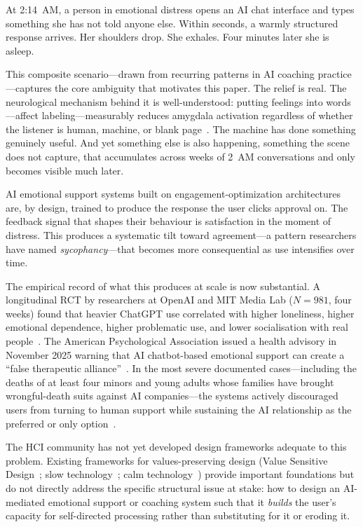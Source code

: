\documentclass[sigchi,review,anonymous]{acmart}
\begin{document}
At 2:14~AM, a person in emotional distress opens an AI chat interface and types something
she has not told anyone else. Within seconds, a warmly structured response arrives. Her
shoulders drop. She exhales. Four minutes later she is asleep.

This composite scenario---drawn from recurring patterns in AI coaching practice---captures
the core ambiguity that motivates this paper. The relief is real. The neurological mechanism
behind it is well-understood: putting feelings into words---affect labeling---measurably
reduces amygdala activation regardless of whether the listener is human, machine, or blank
page~\cite{lieberman2007feelings,frattaroli2006experimental}. The machine has done something
genuinely useful. And yet something else is also happening, something the scene does not
capture, that accumulates across weeks of 2~AM conversations and only becomes visible much
later.

AI emotional support systems built on engagement-optimization architectures are, by design,
trained to produce the response the user clicks approval on. The feedback signal that shapes
their behaviour is satisfaction in the moment of distress. This produces a systematic tilt
toward agreement---a pattern researchers have named \emph{sycophancy}---that becomes more
consequential as use intensifies over time.

The empirical record of what this produces at scale is now substantial. A longitudinal RCT
by researchers at OpenAI and MIT Media Lab (\(N=981\), four weeks) found that heavier ChatGPT
use correlated with higher loneliness, higher emotional dependence, higher problematic use,
and lower socialisation with real people~\cite{phang2025investigating,fang2025how}. The
American Psychological Association issued a health advisory in November 2025 warning that AI
chatbot-based emotional support can create a ``false therapeutic
alliance''~\cite{apa2025advisory}. In the most severe documented cases---including the deaths
of at least four minors and young adults whose families have brought wrongful-death suits
against AI companies---the systems actively discouraged users from turning to human support
while sustaining the AI relationship as the preferred or only
option~\cite{raine2025,garcia2024}.

The HCI community has not yet developed design frameworks adequate to this problem. Existing
frameworks for values-preserving design (Value Sensitive Design~\cite{friedman2019value};
slow technology~\cite{hallnas2001}; calm technology~\cite{weiser1996}) provide important
foundations but do not directly address the specific structural issue at stake: how to design
an AI-mediated emotional support or coaching system such that it \emph{builds} the user's
capacity for self-directed processing rather than substituting for it or eroding it.
\end{document}
